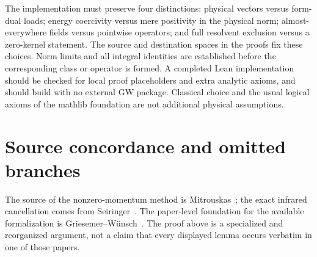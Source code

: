 \documentclass[11pt,a4paper]{article}
\theoremstyle{remark}\newtheorem{remark}[theorem]{Remark}
\begin{document}
The implementation must preserve four distinctions: physical vectors versus form-dual loads; energy coercivity versus mere positivity in the physical norm; almost-everywhere fields versus pointwise operators; and full resolvent exclusion versus a zero-kernel statement. The source and destination spaces in the proofs fix these choices. Norm limits and all integral identities are established before the corresponding class or operator is formed. A completed Lean implementation should be checked for local proof placeholders and extra analytic axioms, and should build with no external GW package. Classical choice and the usual logical axioms of the mathlib foundation are not additional physical assumptions.


\section{Source concordance and omitted branches}\label{sec:concordance}
The source of the nonzero-momentum method is Mitrouskas~\cite{mitrouskas}; the exact infrared cancellation comes from Seiringer~\cite{seiringer}. The paper-level foundation for the available formalization is Griesemer--W\"unsch~\cite{gw}. The proof above is a specialized and reorganized argument, not a claim that every displayed lemma occurs verbatim in one of those papers.
\end{document}
